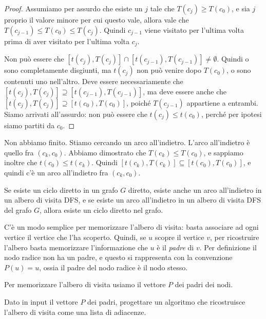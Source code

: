 \begin{proof}
Assumiamo per assurdo che esiste un $j$ tale che $T(c_j) \ge T(c_0)$, e sia $j$ proprio il valore minore per cui questo vale, allora vale che $T(c_{j-1}) \le T(c_0) \le T(c_j)$. Quindi $c_{j-1}$ viene visitato per l'ultima volta prima di aver visitato per l'ultima volta $c_j$. 


Non pu\`o essere che $[t(c_j), T(c_{j})] \cap [t(c_{j-1}), T(c_{j-1})] \neq \emptyset$. Quindi o sono completamente disgiunti, ma $t(c_j)$ non pu\`o venire dopo $T(c_0)$, o sono contenuti uno nell'altro. Deve essere necessariamente che $[t(c_j), T(c_{j})] \supseteq [t(c_{j-1}), T(c_{j-1})]$, ma deve essere anche che $[t(c_j), T(c_{j})] \supseteq [t(c_{0}), T(c_{0})]$, poich\'e $T(c_{j-1})$ appartiene a entrambi. Siamo arrivati all'assurdo: non pu\`o essere che $t(c_j) \le t(c_0)$, perch\'e per ipotesi siamo partiti da $c_0$.
\end{proof}

Non abbiamo finito. Stiamo cercando un arco all'indietro. L'arco all'indietro \`e quello fra $(c_k, c_0)$. Abbiamo dimostrato che $T(c_k) \le T(c_0)$, e sappiamo inoltre che $t(c_0) \le t(c_k)$. Quindi $[t(c_k), T(c_k)] \subseteq [t(c_0), T(c_0)]$, e quindi c'\`e un arco all'indietro fra $(c_k, c_0)$.

\begin{prop}
Se esiste un ciclo diretto in un grafo $G$ diretto, esiste anche un arco all'indietro in un albero di visita DFS, e se esiste un arco all'indietro in un albero di visita DFS del grafo $G$, allora esiste un ciclo diretto nel grafo.
\end{prop}

C'\`e un modo semplice per memorizzare l'albero di visita: basta associare ad ogni vertice il vertice che l'ha scoperto. Quindi, se $u$ scopre il vertice $v$, per ricostruire l'albero basta memorizzare l'informazione che $u$ \`e il \emph{padre} di $v$. Per definizione il nodo radice non ha un padre, e questo si rappresenta con la convenzione $P(u) = u$, ossia il padre del nodo radice \`e il nodo stesso.

Per memorizzare l'albero di visita usiamo il vettore $P$ dei padri dei nodi. 

\begin{esercizio}
Dato in input il vettore $P$ dei padri, progettare un algoritmo che ricostruisce l'albero di visita come una lista di adiacenze.
\end{esercizio}

